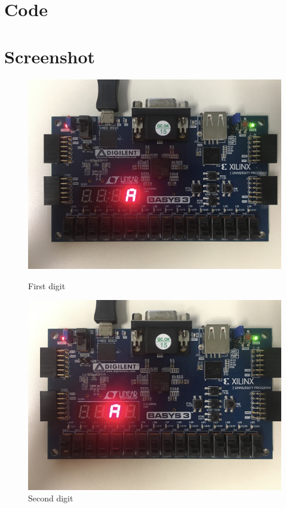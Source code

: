\documentclass[11pt]{article}
\newcommand{\Verilog}[2][]{%
	
}
\begin{document}
\section*{Code}
\Verilog[firstline=23, caption=Multiplexer Implementation]{../verilog_source/mux2_4b.sv}
\Verilog[firstline=23,caption=Multiplexer Test Bench]{../verilog_source/mux2_4b_test.sv}
\Verilog[firstline=23,caption=7-bit Decoder Implementation]{../verilog_source/sseg_decoder.sv}
\Verilog[firstline=23,caption=7-bit Decoder Test Bench]{../verilog_source/sseg_decoder_test.sv}
\Verilog[firstline=23,caption=Decoder Wrap Implementation]{../verilog_source/wrap.sv}
\Verilog[firstline=23,caption=Decoder Wrap Test Bench]{../verilog_source/sseg1_test.sv}

\section*{Screenshot}
\begin{figure}[ht]
	\centering
	\includegraphics[width=12cm]{"board1"}
	\caption{First digit}
	\includegraphics[width=12cm]{"board2"}
	\caption{Second digit}
\end{figure}
\end{document}
